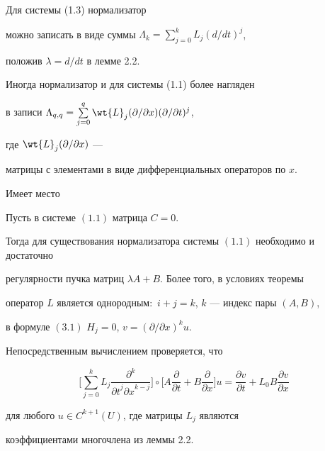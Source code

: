 \begin{notes}


Для системы (1.3) нормализатор


можно записать в виде суммы $\Lambda _{k}=\sum\limits_{j=0}^kL_j(d/dt)^j$,


положив $\lambda =d/dt$ в лемме 2.2.


Иногда нормализатор и для системы (1.1) более нагляден


в записи $\Lambda _{q,q}=


\sum\limits_{j=0}^q\wt {L}_j(\partial /\partial x)(\partial /\partial t)^j$,


где $\wt {L}_j(\partial /\partial x)$ ---


матрицы с элементами в виде дифференциальных операторов по $x$.


\end{notes}





Имеет место 





\begin{thms}


Пусть в системе $(1.1)$ матрица $C=0$.


Тогда для существования нормализатора системы $(1.1)$ необходимо и достаточно


регулярности пучка матриц $\lambda A+B$. Более того, в условиях теоремы


оператор $L$ является однородным\/${:}$ $i+j=k$, $k$ --- индекс пары $(A,B)$,


в формуле $(3.1)$ $H_{j}=0$, $v=(\partial /\partial x)^{k}u$.


\end{thms}





\begin{pf}


Непосредственным вычислением проверяется, что


$$


\bigg [\sum \limits _{j=0}^{k}L_{j}\frac{\partial ^{k}}


{{\partial t}^{j}{\partial x}^{k-j}}\bigg ]\circ


\bigg[A\frac{\partial }{\partial t}+B\frac{\partial }{\partial x}\bigg ]u=


\frac{\partial v}{\partial t}+L_0B\frac{\partial v}{\partial x}


$$


для любого $u\in C^{k+1}(U)$, где матрицы $L_j$ являются


коэффициентами многочлена из леммы 2.2.


\end{pf}





